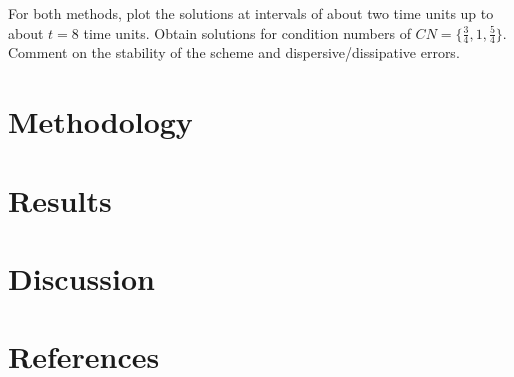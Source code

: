 \documentclass[11pt]{article}
\begin{document}
For both methods, plot the solutions at intervals of about two time units up to about $t=8$ time units. Obtain solutions for condition numbers of $CN = \{\tfrac{3}{4}, 1, \tfrac{5}{4}\}$. Comment on the stability of the scheme and dispersive/dissipative errors.

\section{Methodology} %

\section{Results} %


\section{Discussion} %

\section{References} %
\end{document}
